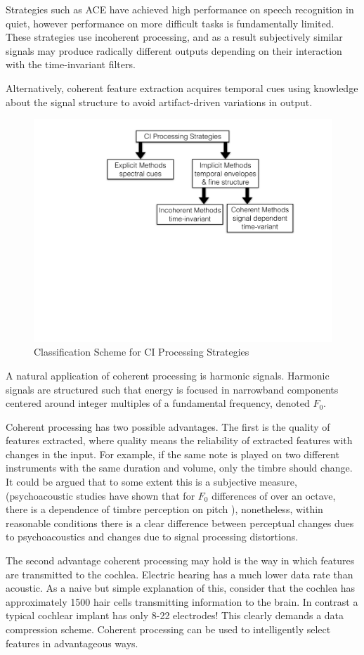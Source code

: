 \documentclass [11pt, proquest,oneside] {ganter_thesis}[2015/03/03]
\begin{document}
Strategies such as ACE have achieved high performance on speech recognition in quiet, however performance on more difficult tasks is fundamentally limited.  These strategies use incoherent processing, and as a result subjectively similar signals may produce radically different outputs depending on their interaction with the time-invariant filters.

Alternatively, coherent feature extraction acquires temporal cues using knowledge about the signal structure to avoid artifact-driven variations in output.

\begin{figure}[!ht]
  \centering
    \includegraphics[width=.6\textwidth]{explicitVimplicit}   
    \caption{Classification Scheme for CI Processing Strategies}\label{fig:explicitVimplicit}
\end{figure}

A natural application of coherent processing is harmonic signals.  Harmonic signals are structured such that energy is focused in narrowband components centered around integer multiples of a fundamental frequency, denoted $F_0$.

Coherent processing has two possible advantages.  The first is the quality of features extracted, where quality means the reliability of extracted features with changes in the input.  For example, if the same note is played on two different instruments with the same duration and volume, only the timbre should change.  It could be argued that to some extent this is a subjective measure, (psychoacoustic studies have shown that for $F_0$ differences of over an octave, there is a dependence of timbre perception on pitch \cite{marozeau2003dependency}), nonetheless, within reasonable conditions there is a clear difference between perceptual changes dues to psychoacoustics and changes due to signal processing distortions.

The second advantage coherent processing may hold is the way in which features are transmitted to the cochlea.  Electric hearing has a much lower data rate than acoustic.  As a naive but simple explanation of this, consider that the cochlea has approximately 1500 hair cells transmitting information to the brain.  In contrast a typical cochlear implant has only 8-22 electrodes!  This clearly demands a data compression scheme.  Coherent processing can be used to intelligently select features in advantageous ways.
\end{document}
